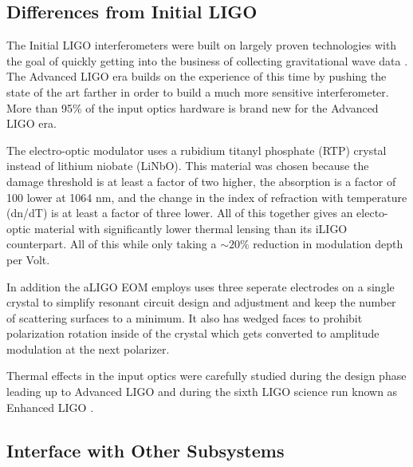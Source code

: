 \subsection{Differences from Initial LIGO}
\label{sec:differences_initial_ligo}

The Initial LIGO interferometers were built on largely proven technologies with the goal of 
quickly getting into the business of collecting gravitational wave data
\cite{fritschel_second_2003}.  
The Advanced LIGO era builds on the experience of this time by pushing the state of the art 
farther in order to build a much more sensitive interferometer.  
More than 95\% of the input optics hardware is brand new for the Advanced LIGO era.  

The electro-optic modulator uses a rubidium titanyl phosphate (RTP) crystal instead 
of lithium niobate (LiNbO).  
This material was chosen because the damage threshold is at least a factor of two higher, 
the absorption is a factor of 100 lower at 1064 nm, and the change in the index of 
refraction with temperature (dn/dT) is at least a factor of three lower.  
All of this together gives an electo-optic material with significantly lower thermal 
lensing than its iLIGO counterpart.  
All of this while only taking a $\sim20\%$ reduction in modulation depth per Volt.

In addition the aLIGO EOM employs uses three seperate electrodes on a single crystal 
to simplify resonant circuit design and adjustment and keep the number of scattering 
surfaces to a minimum.
It also has wedged faces to prohibit polarization rotation inside of the crystal which 
gets converted to amplitude modulation at the next polarizer.  





Thermal effects in the input optics were carefully studied during the design phase leading up 
to Advanced LIGO and during the sixth LIGO science run known as Enhanced LIGO
\cite{dooley_characterization_2011}.  



\subsection{Interface with Other Subsystems}
\label{sec:interface_other_subsystems}

	



